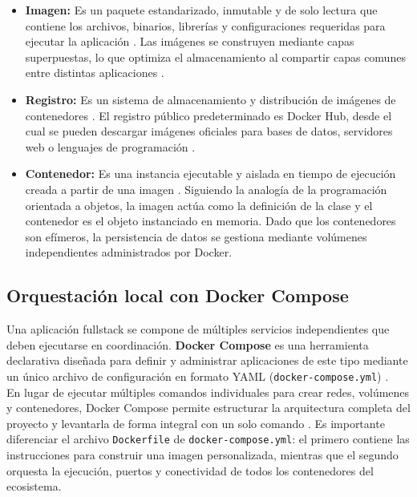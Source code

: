 	\begin{itemize}
		\item \textbf{Imagen:} Es un paquete estandarizado, inmutable y de solo lectura que contiene los archivos, binarios, librer\'ias y configuraciones requeridas para ejecutar la aplicaci\'on \cite{docker_image}. Las im\'agenes se construyen mediante capas superpuestas, lo que optimiza el almacenamiento al compartir capas comunes entre distintas aplicaciones \cite{docker_image}.
		\item \textbf{Registro:} Es un sistema de almacenamiento y distribuci\'on de im\'agenes de contenedores \cite{docker_registry}. El registro p\'ublico predeterminado es Docker Hub, desde el cual se pueden descargar im\'agenes oficiales para bases de datos, servidores web o lenguajes de programaci\'on \cite{docker_registry}.
		\newpage
		\item \textbf{Contenedor:} Es una instancia ejecutable y aislada en tiempo de ejecuci\'on creada a partir de una imagen \cite{docker_container}. Siguiendo la analog\'ia de la programaci\'on orientada a objetos, la imagen act\'ua como la definici\'on de la clase y el contenedor es el objeto instanciado en memoria. Dado que los contenedores son ef\'imeros, la persistencia de datos se gestiona mediante vol\'umenes independientes administrados por Docker.
	\end{itemize}
	
	\subsection{Orquestaci\'on local con Docker Compose}
	Una aplicaci\'on fullstack se compone de m\'ultiples servicios independientes que deben ejecutarse en coordinaci\'on. \textbf{Docker Compose} es una herramienta declarativa diseñada para definir y administrar aplicaciones de este tipo mediante un \'unico archivo de configuraci\'on en formato YAML (\texttt{docker-compose.yml}) \cite{docker_compose}.\\
	
	En lugar de ejecutar m\'ultiples comandos individuales para crear redes, vol\'umenes y contenedores, Docker Compose permite estructurar la arquitectura completa del proyecto y levantarla de forma integral con un solo comando \cite{docker_compose}. Es importante diferenciar el archivo \texttt{Dockerfile} de \texttt{docker-compose.yml}: el primero contiene las instrucciones para construir una imagen personalizada, mientras que el segundo orquesta la ejecuci\'on, puertos y conectividad de todos los contenedores del ecosistema.
